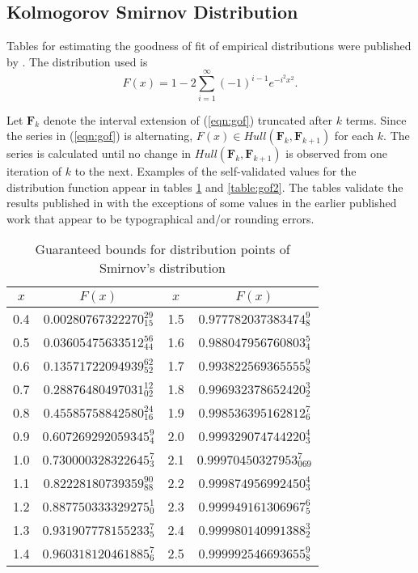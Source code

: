 \subsection{Kolmogorov Smirnov Distribution}

Tables for estimating the goodness of fit of empirical distributions were
published by \cite{Smirnov}. The distribution used is 
\begin{equation}
\label{eqn:gof}
F(x) = 1-2\sum_{i=1}^\infty (-1)^{i-1}e^{-i^2 x^2}.
\end{equation}

Let $\mathbf{F}_k$ denote the interval extension of (\ref{eqn:gof})
truncated after $k$ terms. Since the series 
in (\ref{eqn:gof}) is alternating, 
$F(x) \in Hull(\mathbf{F}_k , \mathbf{F}_{k+1} )$ for each $k$. 
The series is calculated until no 
change in $Hull(\mathbf{F}_k , \mathbf{F}_{k+1} )$
is observed from one iteration of $k$ to the next. Examples of 
the self-validated values for the distribution function appear in tables
\ref{table:gof1} and \ref{table:gof2}. The tables 
validate the results published in \cite{Smirnov} with the exceptions of some values in 
the earlier published work that appear to be typographical and/or rounding errors. 

\begin{table}[ht!]
\caption{\label{table:gof1} Guaranteed bounds for distribution points of
Smirnov's distribution }
\begin{center}
\renewcommand{\arraystretch}{1.3}
\begin{tabular}{c|cc|c}
$x$ & $F(x)$ & $x$ & $F(x)$ \\ \hline
0.4 & $0.00280767322270_{15}^{29}$ & 1.5 & $0.977782037383474_8^9$\\
0.5 & $0.03605475633512^{56}_{44}$ & 1.6 & $0.988047956760803^{ 5}_{ 4 }$\\
0.6 & $0.13571722094939^{62}_{52}$ & 1.7 & $0.993822569365555^{ 9}_{ 8 }$\\
0.7 & $0.28876480497031^{12}_{02}$ & 1.8 & $0.996932378652420^{ 3}_{ 2 }$\\
0.8 & $0.45585758842580^{24}_{16}$ & 1.9 & $0.998536395162812^{ 7}_{ 6 }$\\
0.9 & $0.607269292059345^{9}_{4}$ & 2.0 & $0.999329074744220^{ 4}_{ 3 }$\\
1.0 & $0.730000328322645^{7}_{3}$ & 2.1 & $0.99970450327953^{ 7}_{0 69 }$\\
1.1 & $0.82228180739359^{90}_{88}$ & 2.2 & $0.999874956992450^{ 4}_{ 3 }$\\
1.2 & $0.887750333329275^{1}_{0}$ & 2.3 & $0.999949161306967^{ 6}_{ 5 }$\\
1.3 & $0.931907778155233^{7}_{5}$ & 2.4 & $0.999980140991388^{ 3}_{ 2 }$\\
1.4 & $0.960318120461885^{7}_{6}$ & 2.5 & $0.999992546693655^{ 9}_{ 8 }$
\end{tabular}
\end{center}
\end{table}

